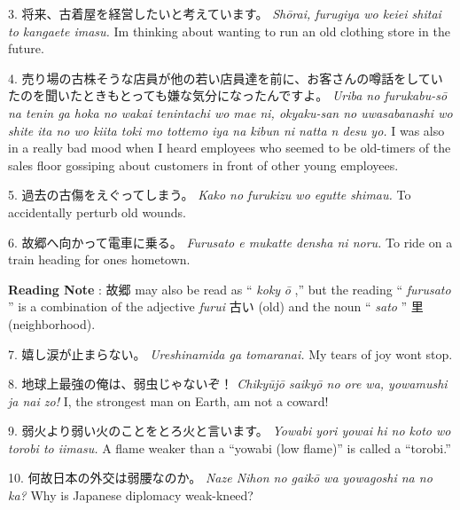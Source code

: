 \par{3. 将来、古着屋を経営したいと考えています。 \hfill\break
 \emph{Shōrai, furugiya wo keiei shitai to kangaete imasu. }\hfill\break
I\textquotesingle m thinking about wanting to run an old clothing store in the future. }
 
\par{4. 売り場の古株そうな店員が他の若い店員達を前に、お客さんの噂話をしていたのを聞いたときもとっても嫌な気分になったんですよ。 \hfill\break
 \emph{Uriba no furukabu-sō na ten\textquotesingle in ga hoka no wakai ten\textquotesingle intachi wo mae ni, okyaku-san no uwasabanashi wo shite ita no wo kiita toki mo tottemo iya na kibun ni natta n desu yo. \hfill\break
 }I was also in a really bad mood when I heard employees who seemed to be old-timers of the sales floor gossiping about customers in front of other young employees. }
 
\par{5. 過去の古傷をえぐってしまう。 \hfill\break
 \emph{Kako no furukizu wo egutte shimau. }\hfill\break
To accidentally perturb old wounds. }
 
\par{6. 故郷へ向かって電車に乗る。 \hfill\break
 \emph{Furusato e mukatte densha ni noru. } \hfill\break
To ride on a train heading for one\textquotesingle s hometown. }
 
\par{\textbf{Reading Note }: 故郷 may also be read as “ \emph{koky }\emph{ō },” but the reading “ \emph{furusato }” is a combination of the adjective \emph{furui }古い (old) and the noun “ \emph{sato }” 里 (neighborhood). }
 
\par{7. 嬉し涙が止まらない。 \hfill\break
 \emph{Ureshinamida ga tomaranai. }\hfill\break
My tears of joy won\textquotesingle t stop. }
 
\par{8. 地球上最強の俺は、弱虫じゃないぞ！ \hfill\break
 \emph{Chikyūjō saikyō no ore wa, yowamushi ja nai zo! }\hfill\break
I, the strongest man on Earth, am not a coward! }
 
\par{9. 弱火より弱い火のことをとろ火と言います。 \hfill\break
 \emph{Yowabi yori yowai hi no koto wo torobi to iimasu. }\hfill\break
A flame weaker than a “yowabi (low flame)” is called a “torobi.” }
 
\par{10. 何故日本の外交は弱腰なのか。 \hfill\break
 \emph{Naze Nihon no gaikō wa yowagoshi na no ka? }\hfill\break
Why is Japanese diplomacy weak-kneed? }
 

